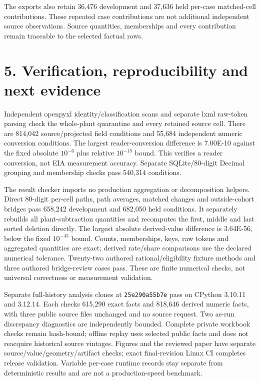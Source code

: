 \documentclass[11pt]{article}
\newcommand{\SourceConditions}{814,042}
\newcommand{\ConversionConditions}{55,684}
\newcommand{\ConversionDifference}{7.00E-10}
\newcommand{\GroupConditions}{540,314}
\newcommand{\DevContributions}{36,476}
\newcommand{\DevChecks}{658,242}
\newcommand{\HeldContributions}{37,636}
\newcommand{\HeldChecks}{682,050}
\newcommand{\MaxDifference}{3.64E-56}
\newcommand{\ReplayExact}{615,290}
\newcommand{\ReplayNumeric}{818,646}
\begin{document}
The exports also retain \DevContributions{} development and \HeldContributions{} held per-case matched-cell contributions. These repeated case contributions are not additional independent source observations. Source quantities, memberships and every contribution remain traceable to the selected factual rows.

\clearpage
\section*{5. Verification, reproducibility and next evidence}
Independent openpyxl identity/classification scans and separate lxml raw-token parsing check the whole-plant quarantine and every retained source cell. There are \SourceConditions{} source/projected field conditions and \ConversionConditions{} independent numeric conversion conditions. The largest reader-conversion difference is \ConversionDifference{} against the fixed absolute $10^{-6}$ plus relative $10^{-15}$ bound. This verifies a reader conversion, not EIA measurement accuracy. Separate SQLite/80-digit Decimal grouping and membership checks pass \GroupConditions{} conditions.

The result checker imports no production aggregation or decomposition helpers. Direct 80-digit per-cell paths, path averages, matched changes and outside-cohort bridges pass \DevChecks{} development and \HeldChecks{} held conditions. It separately rebuilds all plant-subtraction quantities and recomputes the first, middle and last sorted deletion directly. The largest absolute derived-value difference is \MaxDifference{}, below the fixed $10^{-45}$ bound. Counts, memberships, keys, raw tokens and aggregated quantities are exact; derived rate/share comparisons use the declared numerical tolerance. Twenty-two authored rational/eligibility fixture methods and three authored bridge-review cases pass. These are finite numerical checks, not universal correctness or measurement validation.

Separate full-history analysis clones at \texttt{25e290a55b7e} pass on CPython 3.10.11 and 3.12.14. Each checks \ReplayExact{} exact facts and \ReplayNumeric{} derived numeric facts, with three public source files unchanged and no source request. Two as-run discrepancy diagnostics are independently bounded. Complete private workbook checks remain hash-bound; offline replay uses selected public facts and does not reacquire historical source vintages. Figures and the reviewed paper have separate source/value/geometry/artifact checks; exact final-revision Linux CI completes release validation. Variable per-case runtime records stay separate from deterministic results and are not a production-speed benchmark.
\end{document}
